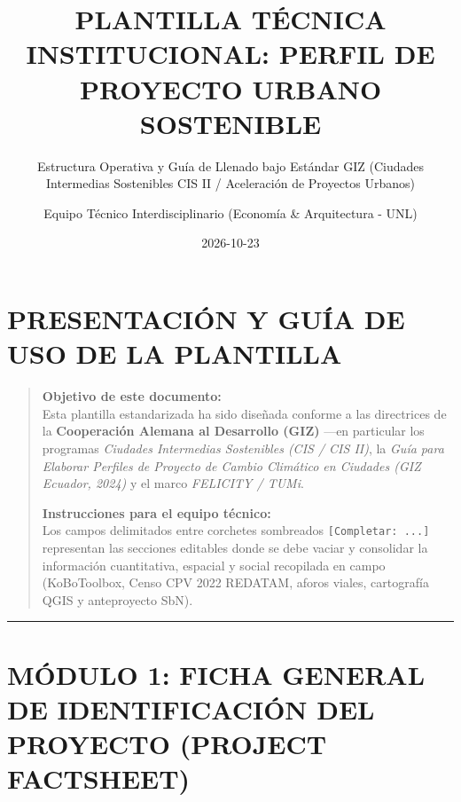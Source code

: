 \documentclass[
  letterpaper,
  DIV=11,
  numbers=noendperiod]{scrreprt}
\title{PLANTILLA TÉCNICA INSTITUCIONAL: PERFIL DE PROYECTO URBANO
SOSTENIBLE}
\subtitle{Estructura Operativa y Guía de Llenado bajo Estándar GIZ
(Ciudades Intermedias Sostenibles CIS II / Aceleración de Proyectos
Urbanos)}
\author{Equipo Técnico Interdisciplinario (Economía \& Arquitectura -
UNL)}
\date{2026-10-23}
\renewcommand*\contentsname{Table of contents}
\newcommand\contentsname{Table of contents}
\begin{document}
\maketitle

\renewcommand*\contentsname{Table of contents}
{
\setcounter{tocdepth}{2}
\tableofcontents
}

\chapter{PRESENTACIÓN Y GUÍA DE USO DE LA
PLANTILLA}\label{presentaciuxf3n-y-guuxeda-de-uso-de-la-plantilla}

\begin{quote}
\textbf{Objetivo de este documento:}\\
Esta plantilla estandarizada ha sido diseñada conforme a las directrices
de la \textbf{Cooperación Alemana al Desarrollo (GIZ)} ---en particular
los programas \emph{Ciudades Intermedias Sostenibles (CIS / CIS II)}, la
\emph{Guía para Elaborar Perfiles de Proyecto de Cambio Climático en
Ciudades (GIZ Ecuador, 2024)} y el marco \emph{FELICITY / TUMi}.

\textbf{Instrucciones para el equipo técnico:}\\
Los campos delimitados entre corchetes sombreados
\texttt{{[}Completar:\ ...{]}} representan las secciones editables donde
se debe vaciar y consolidar la información cuantitativa, espacial y
social recopilada en campo (KoBoToolbox, Censo CPV 2022 REDATAM, aforos
viales, cartografía QGIS y anteproyecto SbN).
\end{quote}

\begin{center}\rule{0.5\linewidth}{0.5pt}\end{center}

\chapter{MÓDULO 1: FICHA GENERAL DE IDENTIFICACIÓN DEL PROYECTO (PROJECT
FACTSHEET)}\label{muxf3dulo-1-ficha-general-de-identificaciuxf3n-del-proyecto-project-factsheet}
\end{document}
